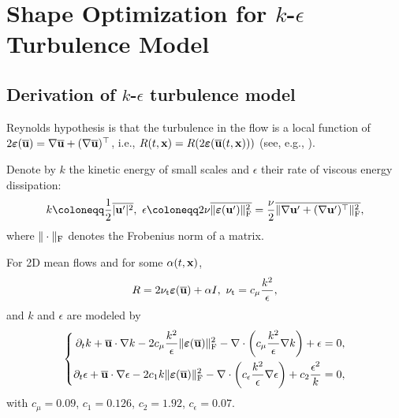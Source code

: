 \documentclass[oneside,11pt]{book}
\numberwithin{equation}{section}
\begin{document}
\chapter{Shape Optimization for $k$-$\epsilon$ Turbulence Model}

\section{Derivation of $k$-$\epsilon$ turbulence model}
Reynolds hypothesis is that the turbulence in the flow is a local function of  $2\boldsymbol{\varepsilon}(\overline{\bf u}) = \nabla\overline{\bf u} + (\nabla\overline{\bf u})^\top$, i.e., $R(t,{\bf x}) = R(2\boldsymbol{\varepsilon}(\overline{\bf u}(t,{\bf x})))$ (see, e.g., \cite{Mohammadi_Pironneau1994, Mohammadi_Pironneau2010}).

Denote by $k$ the kinetic energy of small scales and $\epsilon$ their rate of viscous energy dissipation:
\begin{align}
    k\coloneqq\frac{1}{2}\overline{|{\bf u}'|^2},\ \epsilon\coloneqq 2\nu\overline{\|\boldsymbol{\varepsilon}({\bf u}')\|_{\rm F}^2} = \frac{\nu}{2}\overline{\|\nabla{\bf u}' + (\nabla{\bf u}')^\top\|_{\rm F}^2},
\end{align}
where $\|\cdot\|_{\rm F}$ denotes the Frobenius norm of a matrix.

For 2D mean flows and for some $\alpha(t,{\bf x})$,
\begin{align*}
    R = 2\nu_{\rm t}\boldsymbol{\varepsilon}(\overline{\bf u}) + \alpha I,\ \nu_{\rm t} = c_\mu\frac{k^2}{\epsilon},
\end{align*}
and $k$ and $\epsilon$ are modeled by
\begin{equation}
    \left\{\begin{split}
        \partial_tk + \overline{\bf u}\cdot\nabla k - 2c_\mu\frac{k^2}{\epsilon}\|\boldsymbol{\varepsilon}(\overline{\bf u})\|_{\rm F}^2 - \nabla\cdot\left(c_\mu\frac{k^2}{\epsilon}\nabla k\right) + \epsilon &= 0,\\
        \partial_t\epsilon + \overline{\bf u}\cdot\nabla\epsilon - 2c_1k\|\boldsymbol{\varepsilon}(\overline{\bf u})\|_{\rm F}^2 - \nabla\cdot\left(c_\epsilon\frac{k^2}{\epsilon}\nabla\epsilon\right) + c_2\frac{\epsilon^2}{k} &= 0,
    \end{split}\right.
\end{equation}
with $c_\mu = 0.09$, $c_1 = 0.126$, $c_2 = 1.92$, $c_\epsilon = 0.07$.
\end{document}
